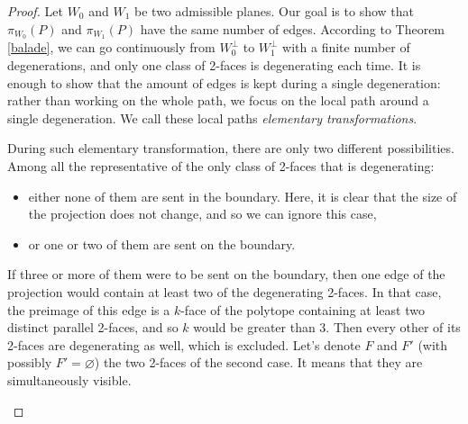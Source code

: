 \documentclass[12pt, notitlepage]{article}
\theoremstyle{plain}
\theoremstyle{definition}
\theoremstyle{plain}
\theoremstyle{remark}
\theoremstyle{plain}
\theoremstyle{plain}
\begin{document}
\begin{proof}
    Let $W_0$ and $W_1$ be two admissible planes. Our goal is to show that $\pi_{W_0}(P)$ and $\pi_{W_1}(P)$ have the same number of edges. According to Theorem \ref{balade}, we can go continuously from $W_0^\perp$ to $W_1^\perp$ with a finite number of degenerations, and only one class of 2-faces is degenerating each time. It is enough to show that the amount of edges is kept during a single degeneration: rather than working on the whole path, we focus on the local path around a single degeneration. We call these local paths \emph{elementary transformations}.
    
    During such elementary transformation, there are only two different possibilities. Among all the representative of the only class of 2-faces that is degenerating: \begin{itemize}
        \item either none of them are sent in the boundary. Here, it is clear that the size of the projection does not change, and so we can ignore this case,
        \item or one or two of them are sent on the boundary.
    \end{itemize}
    If three or more of them were to be sent on the boundary, then one edge of the projection would contain at least two of the degenerating 2-faces. In that case, the preimage of this edge is a $k$-face of the polytope containing at least two distinct parallel 2-faces, and so $k$ would be greater than 3. Then every other of its 2-faces are degenerating as well, which is excluded. Let's denote $F$ and $F'$ (with possibly $F'=\varnothing$) the two 2-faces of the second case. It means that they are simultaneously visible.
    
    \begin{figure}[ht]
    \centering
    \begin{tikzpicture}[x=0.75pt,y=0.75pt,yscale=-1,xscale=1]


\end{tikzpicture}
\end{figure}
\end{proof}
\end{document}
